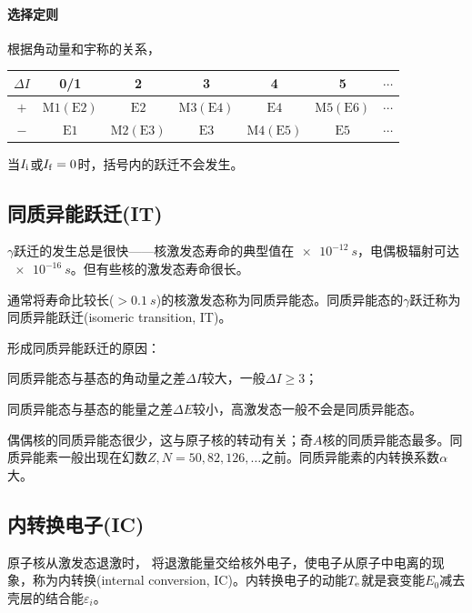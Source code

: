 \paragraph{选择定则}根据角动量和宇称的关系，
\begin{notecaptionblock}
	\begin{tabular}{ccccccc}
		\toprule
		$\Delta I$&0/1&2&3&4&5&$\cdots$\\
		\midrule
		$+$&$\mathrm{M}1(\mathrm{E}2)$&$\mathrm{E}2$&$\mathrm{M}3(\mathrm{E}4)$&$\mathrm{E}4$&$\mathrm{M}5(\mathrm{E}6)$&$\cdots$\\
		$-$&$\mathrm{E}1$&$\mathrm{M}2(\mathrm{E}3)$&$\mathrm{E}3$&$\mathrm{M}4(\mathrm{E}5)$&$\mathrm{E}5$&$\cdots$\\
		\bottomrule
	\end{tabular}
\end{notecaptionblock}
\begin{remark}
	当$I_\mathrm i$或$I_\mathrm f = 0$时，括号内的跃迁不会发生。
\end{remark}

\subsection{同质异能跃迁(IT)}

$\gamma$跃迁的发生总是很快——核激发态寿命的典型值在$\qty{e-12}{s}$，电偶极辐射可达$\qty{e-16}{s}$。但有些核的激发态寿命很长。

通常将寿命比较长($> \qty{0.1}{s}$)的核激发态称为同质异能态。同质异能态的$\gamma$跃迁称为同质异能跃迁(isomeric transition, IT)。

形成同质异能跃迁的原因：
\begin{compactenum}
	\item 同质异能态与基态的角动量之差$\Delta I$较大，一般$\Delta I \geqslant 3$；
	\item 同质异能态与基态的能量之差$\Delta E$较小，高激发态一般不会是同质异能态。
\end{compactenum}
偶偶核的同质异能态很少，这与原子核的转动有关；奇$A$核的同质异能态最多。同质异能素一般出现在幻数$Z,N = 50,82,126,\ldots$之前。同质异能素的内转换系数$\alpha$大。

\subsection{内转换电子(IC)}

原子核从激发态退激时，%
将退激能量交给核外电子，使电子从原子中电离的现象，称为内转换(internal conversion, IC)。内转换电子的动能$T_{\mathrm{e}}$就是衰变能$E_0$减去壳层的结合能$\varepsilon_i$。

